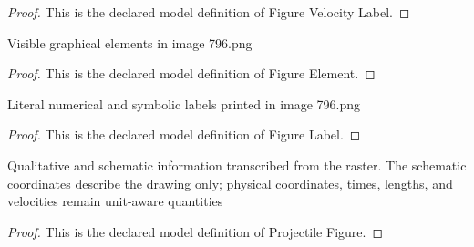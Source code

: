 \begin{proof}
  This is the declared model definition of Figure Velocity Label.
\end{proof}
\begin{definition}
  \label{def:physics:phyx-mini-0796:phyxminiproblems-problemphyxmini0796-figureelement}
  Visible graphical elements in image 796.png
\end{definition}
\begin{proof}
  This is the declared model definition of Figure Element.
\end{proof}
\begin{definition}
  \label{def:physics:phyx-mini-0796:phyxminiproblems-problemphyxmini0796-figurelabel}
  Literal numerical and symbolic labels printed in image 796.png
\end{definition}
\begin{proof}
  This is the declared model definition of Figure Label.
\end{proof}
\begin{definition}
  \label{def:physics:phyx-mini-0796:phyxminiproblems-problemphyxmini0796-projectilefigure}
  Qualitative and schematic information transcribed from the raster. The schematic coordinates describe the drawing only; physical coordinates, times, lengths, and velocities remain unit-aware quantities
\end{definition}
\begin{proof}
  This is the declared model definition of Projectile Figure.
\end{proof}

